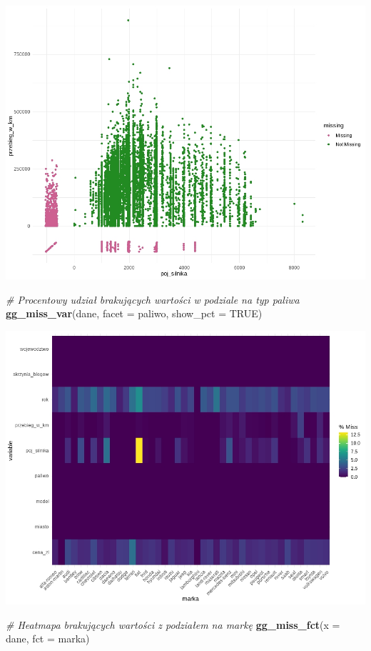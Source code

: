 \documentclass[
]{article}
\newenvironment{Shaded}{\begin{snugshade}}{\end{snugshade}}
\newcommand{\AttributeTok}[1]{\textcolor[rgb]{0.13,0.29,0.53}{#1}}
\newcommand{\CommentTok}[1]{\textcolor[rgb]{0.56,0.35,0.01}{\textit{#1}}}
\newcommand{\ConstantTok}[1]{\textcolor[rgb]{0.56,0.35,0.01}{#1}}
\newcommand{\FunctionTok}[1]{\textcolor[rgb]{0.13,0.29,0.53}{\textbf{#1}}}
\newcommand{\NormalTok}[1]{#1}
\begin{document}
\includegraphics[width=1\linewidth]{images/8}

\begin{Shaded}
\begin{Highlighting}[]
\CommentTok{\# Procentowy udział brakujących wartości w podziale na typ paliwa}
\FunctionTok{gg\_miss\_var}\NormalTok{(dane, }\AttributeTok{facet =}\NormalTok{ paliwo, }\AttributeTok{show\_pct =} \ConstantTok{TRUE}\NormalTok{)}
\end{Highlighting}
\end{Shaded}

\includegraphics[width=1\linewidth]{images/9}

\begin{Shaded}
\begin{Highlighting}[]
\CommentTok{\# Heatmapa brakujących wartości z podziałem na markę}
\FunctionTok{gg\_miss\_fct}\NormalTok{(}\AttributeTok{x =}\NormalTok{ dane, }\AttributeTok{fct =}\NormalTok{ marka)}
\end{Highlighting}
\end{Shaded}
\end{document}
